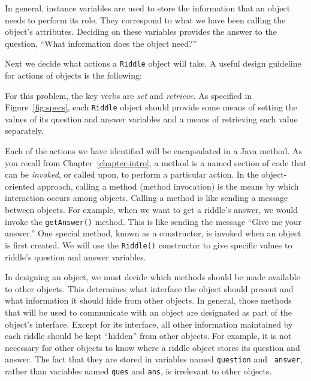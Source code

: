 In general, instance variables are used to store the information that
an object needs to perform its role.
They correspond to what we have been calling the object's
attributes. Deciding on these variables provides the answer to the
question, ``What information does the object need?''  

Next we decide what actions a {\tt Riddle} object will take.
A useful design guideline for actions of objects is the following:


\noindent For this problem,
the key verbs are {\it set} and {\it retrieve}.  As specified in
Figure~\ref{fig:specs}, each {\tt Riddle} object should provide some
means of setting the values of its question and answer variables and a
means of retrieving each value separately.

Each of the actions we have identified will be encapsulated in a Java
method. As you recall from Chapter~\ref{chapter-intro}, a method is a named section of
code that can be {\em invoked}, or called upon, to perform a
particular action. In the object-oriented approach, calling a method
(method invocation) is the means by which interaction occurs among
objects. Calling a method is like sending a message between
objects. For example, when we want to get a riddle's answer, we
would invoke the {\tt getAnswer()} method.  This is like sending the
message ``Give me your answer.''  One special method, known as a
constructor, is invoked when an object is first created. We will use
the {\tt Riddle()} constructor to give specific values to riddle's
question and answer variables.

In designing an object, we must decide which methods should be made
  available to other objects. This
determines what interface the object should present and what
information it should hide from other objects.  In general, those
methods that will be used to communicate with an object are designated
as part of the object's interface. Except for its interface, all other
information maintained by each riddle should be kept ``hidden'' from
other objects. For example, it is not necessary for other objects to
know where a riddle object stores its question and answer. The fact
that they are stored in variables named {\tt question} and {\tt
answer}, rather than variables named {\tt ques} and {\tt ans}, is
irrelevant to other objects.


